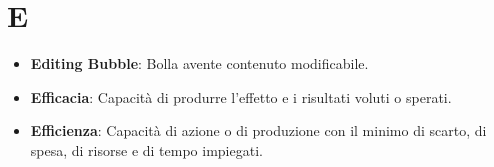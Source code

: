 \section*{E}
\begin{itemize}
	\item
	\textbf{Editing Bubble}: Bolla avente contenuto modificabile.
	\item
	\textbf{Efficacia}: Capacità di produrre l'effetto e i risultati voluti o sperati.
	\item
	\textbf{Efficienza}: Capacità di azione o di produzione con il minimo di scarto, di spesa, di risorse e di tempo impiegati.
\end{itemize}
\newpage